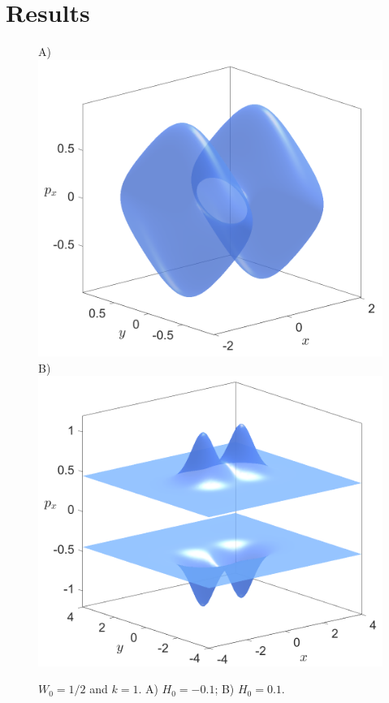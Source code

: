 \documentclass[10pt,aps,onecolumn,superscriptaddress]{revtex4-2}
\begin{document}
\section{Results}
\label{sec:results}


\begin{figure}[htbp]
	A)\includegraphics[scale=0.28]{energySurf_H_-01.png}
	B)\includegraphics[scale=0.28]{energySurf_H_01.png}
	\caption{$W_0 = 1/2$ and $k = 1$. A) $H_0 = -0.1$; B) $H_0 = 0.1$.}
	\label{fig:vdw-energyHyp}
\end{figure}
\end{document}
